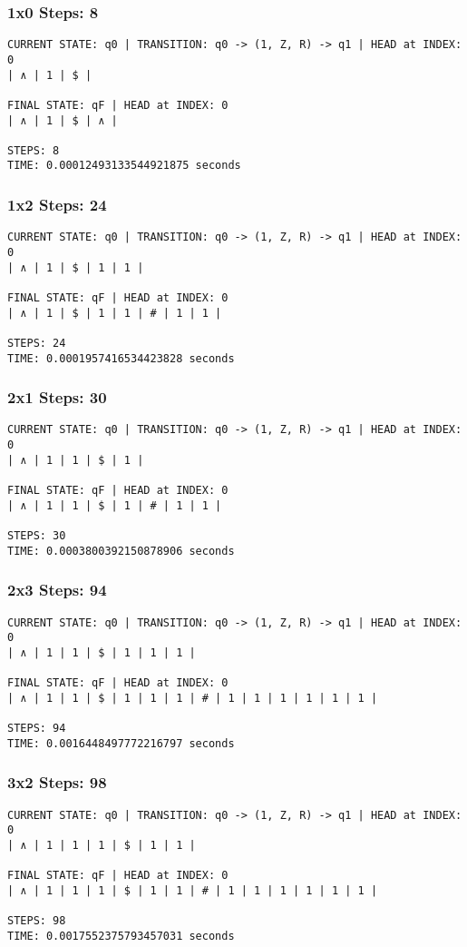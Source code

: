 \documentclass[a4paper,12pt]{article}
\begin{document}
\subsubsection{1x0 \textbar Steps: 8}
\begin{lstlisting}
CURRENT STATE: q0 | TRANSITION: q0 -> (1, Z, R) -> q1 | HEAD at INDEX: 0
| ∧ | 1 | $ |

FINAL STATE: qF | HEAD at INDEX: 0
| ∧ | 1 | $ | ∧ |

STEPS: 8
TIME: 0.00012493133544921875 seconds
\end{lstlisting}
\subsubsection{1x2 \textbar Steps: 24}
\begin{lstlisting}
CURRENT STATE: q0 | TRANSITION: q0 -> (1, Z, R) -> q1 | HEAD at INDEX: 0
| ∧ | 1 | $ | 1 | 1 |

FINAL STATE: qF | HEAD at INDEX: 0
| ∧ | 1 | $ | 1 | 1 | # | 1 | 1 |

STEPS: 24
TIME: 0.0001957416534423828 seconds

\end{lstlisting}
\subsubsection{2x1 \textbar Steps: 30}
\begin{lstlisting}
CURRENT STATE: q0 | TRANSITION: q0 -> (1, Z, R) -> q1 | HEAD at INDEX: 0
| ∧ | 1 | 1 | $ | 1 |

FINAL STATE: qF | HEAD at INDEX: 0
| ∧ | 1 | 1 | $ | 1 | # | 1 | 1 |

STEPS: 30
TIME: 0.0003800392150878906 seconds

\end{lstlisting}
\subsubsection{2x3 \textbar Steps: 94}
\begin{lstlisting}
CURRENT STATE: q0 | TRANSITION: q0 -> (1, Z, R) -> q1 | HEAD at INDEX: 0
| ∧ | 1 | 1 | $ | 1 | 1 | 1 |

FINAL STATE: qF | HEAD at INDEX: 0
| ∧ | 1 | 1 | $ | 1 | 1 | 1 | # | 1 | 1 | 1 | 1 | 1 | 1 |

STEPS: 94
TIME: 0.0016448497772216797 seconds
\end{lstlisting}
\subsubsection{3x2 \textbar Steps: 98}
\begin{lstlisting}
CURRENT STATE: q0 | TRANSITION: q0 -> (1, Z, R) -> q1 | HEAD at INDEX: 0
| ∧ | 1 | 1 | 1 | $ | 1 | 1 |

FINAL STATE: qF | HEAD at INDEX: 0
| ∧ | 1 | 1 | 1 | $ | 1 | 1 | # | 1 | 1 | 1 | 1 | 1 | 1 |

STEPS: 98
TIME: 0.0017552375793457031 seconds
\end{lstlisting}
\end{document}
